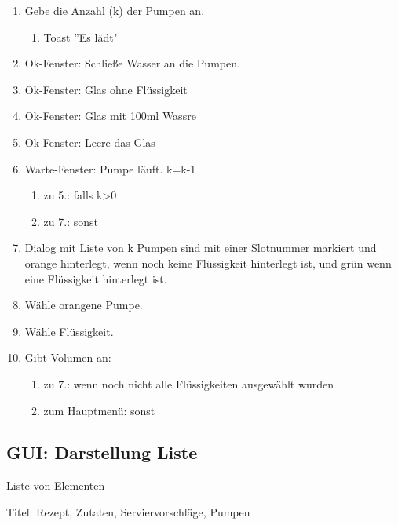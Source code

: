 \begin{enumerate}
\item Gebe die Anzahl (k) der Pumpen an.
\begin{enumerate}
	\item Toast ''Es lädt"	
\end{enumerate}
	\item Ok-Fenster: Schließe Wasser an die Pumpen.
	
	\item Ok-Fenster: Glas ohne Flüssigkeit
	
    \item Ok-Fenster: Glas mit 100ml Wassre
	
	\item Ok-Fenster: Leere das Glas
	
	\item Warte-Fenster: Pumpe läuft. k=k-1

\begin{enumerate}
		\item zu 5.: falls k>0
		
		\item zu 7.: sonst

\end{enumerate}
\item Dialog mit Liste von k Pumpen sind mit einer Slotnummer markiert und orange hinterlegt, wenn noch keine Flüssigkeit hinterlegt ist, und grün wenn eine Flüssigkeit hinterlegt ist.

\item Wähle orangene Pumpe.

\item Wähle Flüssigkeit.

\item Gibt Volumen an:
\begin{enumerate}

\item zu 7.: wenn noch nicht alle Flüssigkeiten ausgewählt wurden

\item zum Hauptmenü: sonst
\end{enumerate}
\end{enumerate}


\subsection{GUI: Darstellung Liste}
Liste von Elementen

Titel: Rezept, Zutaten, Serviervorschläge, Pumpen

